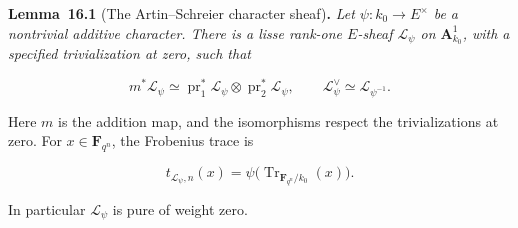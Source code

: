 \documentclass[11pt]{article}
\newenvironment{bpstatement}[2]{\par\addvspace{0.6\baselineskip}\noindent\textbf{#1}#2\textbf{.}\enspace\ignorespaces}
  {\par\addvspace{0.4\baselineskip}}
\newenvironment{bpstatementit}[2]{\begin{bpstatement}{#1}{#2}\itshape\ignorespaces}{\end{bpstatement}}
\begin{document}
\label{bp5}%
\begin{bpstatementit}{Lemma~16.1}{ (The Artin–Schreier character sheaf)}
Let \(\psi:k_0\to E^\times\) be a nontrivial additive character. There is a lisse rank-one \(E\)-sheaf \(\mathcal L_\psi\) on \(\mathbf A^1_{k_0}\), with a specified trivialization at zero, such that

\[
m^*\mathcal L_\psi\simeq
\operatorname{pr}_1^*\mathcal L_\psi\otimes
\operatorname{pr}_2^*\mathcal L_\psi,
\qquad
\mathcal L_\psi^\vee\simeq\mathcal L_{\psi^{-1}}.
\]

Here \(m\) is the addition map, and the isomorphisms respect the trivializations at zero. For \(x\in\mathbf F_{q^n}\), the Frobenius trace is

\[
t_{\mathcal L_\psi,n}(x)
=\psi\bigl(\operatorname{Tr}_{\mathbf F_{q^n}/k_0}(x)\bigr).
\]

In particular \(\mathcal L_\psi\) is pure of weight zero.
\end{bpstatementit}
\end{document}
